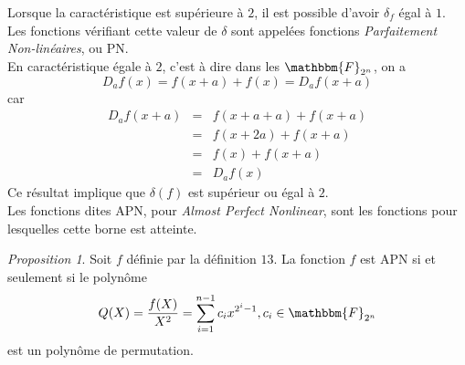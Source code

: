 \documentclass[12pt]{article}
\theoremstyle{remark}\newtheorem{note}{Note}
\theoremstyle{remark}\newtheorem{nota}{Notation}
\newcommand{\F}{\mathbbm{F}}
\newtheorem{prop}{Proposition}
\theoremstyle{definition}
\begin{document}
Lorsque la caractéristique est supérieure à $2$, il est possible d'avoir $\delta_f$ égal à $1$. Les fonctions vérifiant cette valeur de $\delta$ sont appelées fonctions \textit{Parfaitement Non-linéaires}, ou \textsf{PN}.\\
En caractéristique égale à $2$, c'est à dire dans les $\F_{2^n}$, on a 
$$D_af(x)=f(x+a)+f(x)=D_af(x+a)$$
car 
\begin{eqnarray}
\nonumber
D_af(x+a) &=& f(x+a+a)+f(x+a) \\ \nonumber
&=& f(x+2a)+f(x+a)  \\ \nonumber
&=& f(x)+f(x+a)\\ \nonumber
&=& D_af(x) \nonumber
\end{eqnarray}
Ce résultat implique que $\delta(f)$ est supérieur ou égal à $2$.\\
Les fonctions dites \textsf{APN}, pour \textit{Almost Perfect Nonlinear}, sont les fonctions pour lesquelles cette borne est atteinte.

\begin{prop}
Soit $f$ définie par la définition $13$. La fonction $f$ est APN si et seulement si le polynôme
$$Q(X)=\frac{f(X)}{X^2}= \displaystyle\sum_{i=1}^{n-1} c_i x^{2^i-1}, c_i \in \F_{2^n}$$
est un polynôme de permutation.
\end{prop}
\end{document}
